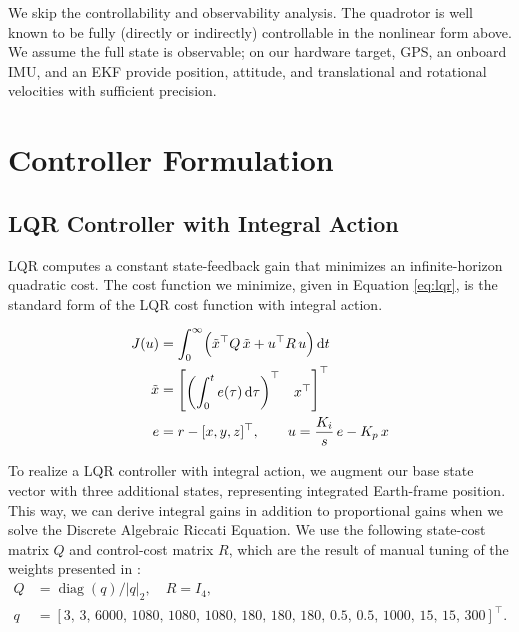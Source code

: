 \documentclass[conf]{new-aiaa}
\begin{document}
We skip the controllability and observability analysis. The quadrotor is well known to be fully (directly or indirectly) controllable in the nonlinear form above. We assume the full state is observable; on our hardware target, GPS, an onboard IMU, and an EKF provide position, attitude, and translational and rotational velocities with sufficient precision.

\section{Controller Formulation}

\subsection{LQR Controller with Integral Action}
LQR computes a constant state-feedback gain that minimizes an infinite-horizon quadratic cost. The cost function we minimize, given in Equation \ref{eq:lqr}, is the standard form of the LQR cost function with integral action.

\small
\begin{equation}
\label{eq:lqr}
\begin{aligned}
J(u) &= \int_{0}^{\infty} \Bigl( \tilde{x}^{\top} Q\, \tilde{x}
+ u^{\top} R\, u \Bigr)\,\mathrm{d}t \\
\tilde{x} &=
\begin{bmatrix}
\left(\displaystyle \int_{0}^{t} e(\tau)\,\mathrm{d}\tau\right)^{\top} & x^{\top}
\end{bmatrix}^{\top} \\
e &= r - [x, y, z]^{\top},
\qquad
u = \frac{K_i}{s}\, e - K_p\, x
\end{aligned}
\end{equation}
\normalsize

To realize a LQR controller with integral action, we augment our base state vector with three additional states, representing integrated Earth-frame position. This way, we can derive integral gains in addition to proportional gains when we solve the Discrete Algebraic Riccati Equation. We use the following state-cost matrix $Q$ and control-cost matrix $R$, which are the result of manual tuning of the weights presented in \cite{refs:Tahir2020}:
\small
\begin{equation}
\begin{aligned}
Q &= \operatorname{diag}(q) \big/ \bigl|q\bigr|_2, \quad R = I_4, \\
q &= [3,\,3,\,6000,\,1080,\,1080,\,1080,\,180,\,180,\,180,\,0.5,\,0.5,\,1000,\,15,\,15,\,300]^{\top}.
\end{aligned}
\end{equation}
\normalsize
\end{document}
